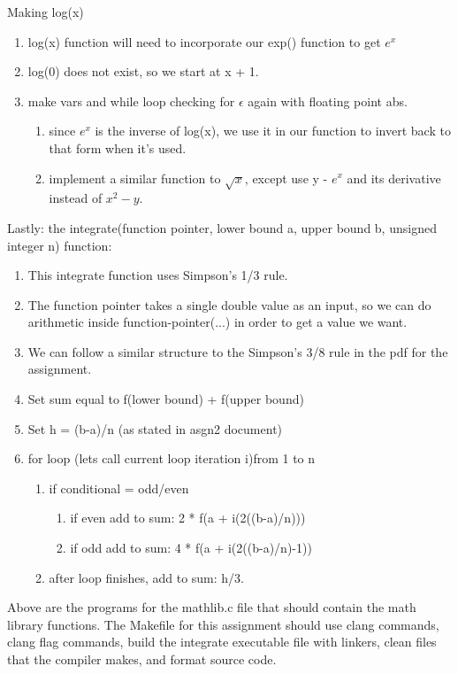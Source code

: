 \documentclass[11pt]{article}
\begin{document}
Making log(x)
\begin{enumerate}
	\item log(x) function will need to incorporate our exp() function to get \(e^x\)
	\item log(0) does not exist, so we start at x + 1.
	\item make vars and while loop checking for $\epsilon$ again with floating point abs.
	\begin{enumerate}
		\item since \(e^x\) is the inverse of log(x), we use it in our function to invert back to that form when it's used.
		\item implement a similar function to \(\sqrt{x}\), except use y - \(e^x\) and its derivative instead of \(x^2 - y\).
	\end{enumerate}
\end{enumerate}
Lastly: the integrate(function pointer, lower bound a, upper bound b, unsigned integer n) function:
\begin{enumerate}
	\item This integrate function uses Simpson's 1/3 rule.
	\item The function pointer takes a single double value as an input, so we can do arithmetic inside function-pointer(...) in order to get a value we want.
	\item We can follow a similar structure to the Simpson's 3/8 rule in the pdf for the assignment.
	\item Set sum equal to f(lower bound) + f(upper bound)
	\item Set h = (b-a)/n (as stated in asgn2 document)
	\item for loop (lets call current loop iteration i)from 1 to n
	\begin{enumerate}
		\item if conditional = odd/even
		\begin{enumerate}
			\item if even add to sum: 2 * f(a + i(2((b-a)/n)))
			\item if odd add to sum:  4 * f(a + i(2((b-a)/n)-1))
		\end{enumerate}
	\item after loop finishes, add to sum: h/3.
	\end{enumerate}
\end{enumerate}

Above are the programs for the mathlib.c file that should contain the math library functions.
The Makefile for this assignment should use clang commands, clang flag commands, build the integrate executable file with linkers, clean files that the compiler makes, and format source code.
\end{document}

